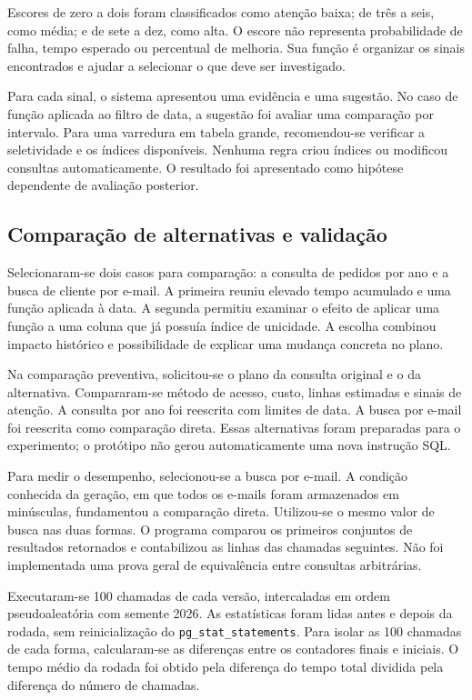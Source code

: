 \documentclass{UNESC}
\begin{document}
Escores de zero a dois foram classificados como atenção baixa; de três a seis, como média; e de sete a dez, como alta. O escore não representa probabilidade de falha, tempo esperado ou percentual de melhoria. Sua função é organizar os sinais encontrados e ajudar a selecionar o que deve ser investigado.

Para cada sinal, o sistema apresentou uma evidência e uma sugestão. No caso de função aplicada ao filtro de data, a sugestão foi avaliar uma comparação por intervalo. Para uma varredura em tabela grande, recomendou-se verificar a seletividade e os índices disponíveis. Nenhuma regra criou índices ou modificou consultas automaticamente. O resultado foi apresentado como hipótese dependente de avaliação posterior.

\subsection{Comparação de alternativas e validação}

Selecionaram-se dois casos para comparação: a consulta de pedidos por ano e a busca de cliente por e-mail. A primeira reuniu elevado tempo acumulado e uma função aplicada à data. A segunda permitiu examinar o efeito de aplicar uma função a uma coluna que já possuía índice de unicidade. A escolha combinou impacto histórico e possibilidade de explicar uma mudança concreta no plano.

Na comparação preventiva, solicitou-se o plano da consulta original e o da alternativa. Compararam-se método de acesso, custo, linhas estimadas e sinais de atenção. A consulta por ano foi reescrita com limites de data. A busca por e-mail foi reescrita como comparação direta. Essas alternativas foram preparadas para o experimento; o protótipo não gerou automaticamente uma nova instrução SQL.

Para medir o desempenho, selecionou-se a busca por e-mail. A condição conhecida da geração, em que todos os e-mails foram armazenados em minúsculas, fundamentou a comparação direta. Utilizou-se o mesmo valor de busca nas duas formas. O programa comparou os primeiros conjuntos de resultados retornados e contabilizou as linhas das chamadas seguintes. Não foi implementada uma prova geral de equivalência entre consultas arbitrárias.

Executaram-se 100 chamadas de cada versão, intercaladas em ordem pseudoaleatória com semente 2026. As estatísticas foram lidas antes e depois da rodada, sem reinicialização do \texttt{pg\_stat\_statements}. Para isolar as 100 chamadas de cada forma, calcularam-se as diferenças entre os contadores finais e iniciais. O tempo médio da rodada foi obtido pela diferença do tempo total dividida pela diferença do número de chamadas.
\end{document}
